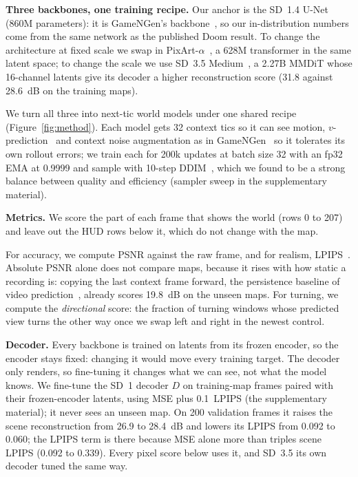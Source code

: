 \documentclass{article}
\newif\ifwithappendix \withappendixfalse %
\newcommand{\appref}[1]{\ifwithappendix Appendix~\ref{#1}\else the supplementary material\fi}
\begin{document}
\textbf{Three backbones, one training recipe.} Our anchor is the SD~1.4 U-Net~\citep{rombach2022ldm} (860M parameters): it is GameNGen's backbone~\citep{valevski2024gamengen}, so our in-distribution numbers come from the same network as the published Doom result. To change the architecture at fixed scale we swap in PixArt-$\alpha$~\citep{chen2023pixart}, a 628M transformer in the same latent space; to change the scale we use SD~3.5 Medium~\citep{esser2024sd3}, a 2.27B MMDiT whose 16-channel latents give its decoder a higher reconstruction score (31.8 against 28.6~dB on the training maps).

We turn all three into next-tic world models under one shared recipe (Figure~\ref{fig:method}). Each model gets 32 context tics so it can see motion, $v$-prediction~\citep{salimans2022progressive} and context noise augmentation as in GameNGen~\citep{valevski2024gamengen} so it tolerates its own rollout errors; we train each for 200k updates at batch size 32 with an fp32 EMA at 0.9999 and sample with 10-step DDIM~\citep{song2021ddim}, which we found to be a strong balance between quality and efficiency (sampler sweep in \appref{app:protocol}).

\textbf{Metrics.} We score the part of each frame that shows the world (rows 0 to 207) and leave out the HUD rows below it, which do not change with the map.

For accuracy, we compute PSNR against the raw frame, and for realism, LPIPS~\citep{zhang2018lpips}. Absolute PSNR alone does not compare maps, because it rises with how static a recording is: copying the last context frame forward, the persistence baseline of video prediction~\citep{mathieu2016deep}, already scores 19.8~dB on the unseen maps. For turning, we compute the \emph{directional} score: the fraction of turning windows whose predicted view turns the other way once we swap left and right in the newest control.


\textbf{Decoder.} Every backbone is trained on latents from its frozen encoder, so the encoder stays fixed: changing it would move every training target. The decoder only renders, so fine-tuning it changes what we can see, not what the model knows.
We fine-tune the SD~1 decoder $D$ on training-map frames paired with their frozen-encoder latents, using MSE plus 0.1~LPIPS (\appref{app:protocol}); it never sees an unseen map.
On 200 validation frames it raises the scene reconstruction from 26.9 to 28.4~dB and lowers its LPIPS from 0.092 to 0.060; the LPIPS term is there because MSE alone more than triples scene LPIPS (0.092 to 0.339).
Every pixel score below uses it, and SD~3.5 its own decoder tuned the same way.
\end{document}

